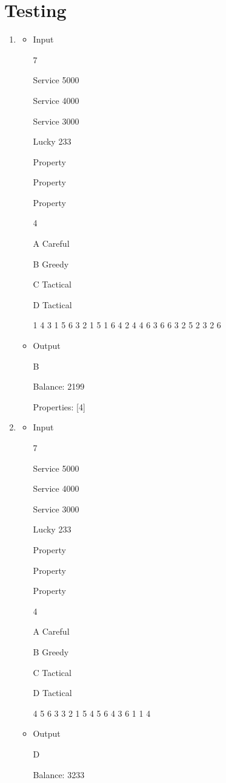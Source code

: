 \documentclass[a4paper, 12pt]{report}
\begin{document}
\chapter{Testing}
\begin{enumerate}
\item
	\begin{itemize}
		\item Input
		
7

Service 5000

Service 4000

Service 3000

Lucky 233

Property

Property

Property

4

A Careful

B Greedy

C Tactical

D Tactical

1 4 3 1 5 6 3 2 1 5 1 6 4 2 4 4 6 3 6 6 3 2 5 2 3 2 6

		\item Output
		
B

Balance: 2199

Properties: [4]

	\end{itemize}
\item
	\begin{itemize}
		\item Input
		
7

Service 5000

Service 4000

Service 3000

Lucky 233

Property

Property

Property

4

A Careful

B Greedy

C Tactical

D Tactical

4 5 6 3 3 2 1 5 4 5 6 4 3 6 1 1 4

		\item Output
		
D

Balance: 3233


\end{itemize}
\end{enumerate}
\end{document}
